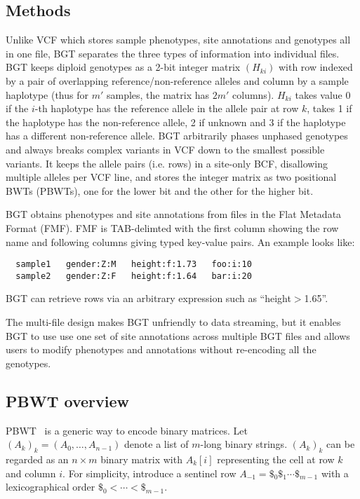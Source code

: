 \documentclass{bioinfo}
\begin{document}
\begin{methods}
\section{Methods}
Unlike VCF which stores sample phenotypes, site annotations and genotypes all
in one file, BGT separates the three types of information into individual
files.  BGT keeps diploid genotypes as a 2-bit integer matrix $(H_{ki})$ with
row indexed by a pair of overlapping reference/non-reference alleles and column
by a sample haplotype (thus for $m'$ samples, the matrix has $2m'$ columns).
$H_{ki}$ takes value 0 if the $i$-th haplotype has the reference allele in the
allele pair at row $k$, takes 1 if the haplotype has the non-reference allele,
2 if unknown and 3 if the haplotype has a different non-reference allele. BGT
arbitrarily phases unphased genotypes and always breaks complex variants in VCF
down to the smallest possible variants. It keeps the allele pairs (i.e.  rows)
in a site-only BCF, disallowing multiple alleles per VCF line, and stores the
integer matrix as two positional BWTs (PBWTs), one for the lower bit and the
other for the higher bit.

BGT obtains phenotypes and site annotations from files in the Flat Metadata
Format (FMF). FMF is TAB-delimted with the first column showing the row name
and following columns giving typed key-value pairs. An example looks like:
\begin{center}
\begin{verbatim}
  sample1   gender:Z:M   height:f:1.73   foo:i:10
  sample2   gender:Z:F   height:f:1.64   bar:i:20
\end{verbatim}
\end{center}
BGT can retrieve rows via an arbitrary expression such as ``height$>$1.65''.

The multi-file design makes BGT unfriendly to data streaming, but it enables
BGT to use use one set of site annotations across multiple BGT files and allows
users to modify phenotypes and annotations without re-encoding all the genotypes.

\subsection{PBWT overview}

PBWT~\citep{Durbin:2014yq} is a generic way to encode binary matrices.  Let
$(A_k)_k=(A_0,\ldots,A_{n-1})$ denote a list of $m$-long binary strings. $(A_k)_k$
can be regarded as an $n\times m$ binary matrix with $A_k[i]$ representing the
cell at row $k$ and column $i$.  For simplicity, introduce a sentinel row
$A_{-1}=\$_0\$_1\cdots\$_{m-1}$ with a lexicographical order
$\$_0<\cdots<\$_{m-1}$.


\end{methods}
\end{document}
